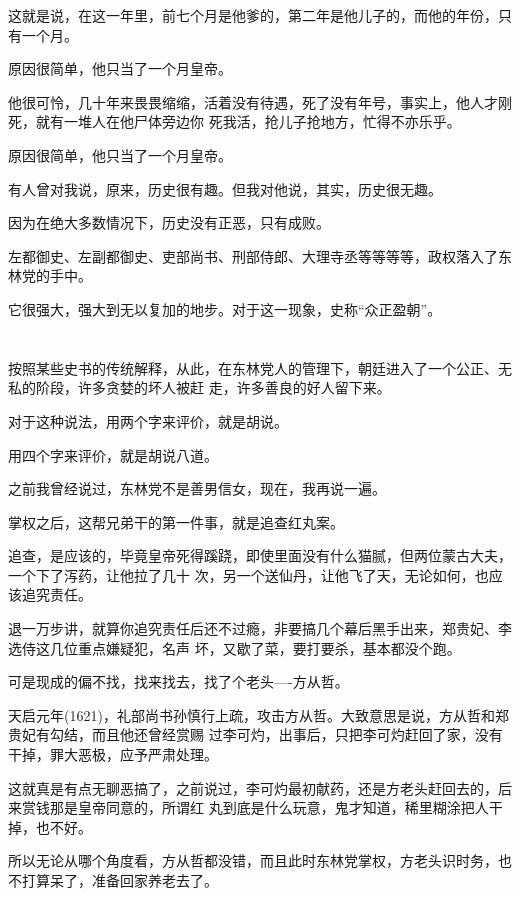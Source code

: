 \documentclass[11pt,a4paper,onecolumn]{article}
\begin{document}
这就是说，在这一年里，前七个月是他爹的，第二年是他儿子的，而他的年份，只有一个月。

原因很简单，他只当了一个月皇帝。

他很可怜，几十年来畏畏缩缩，活着没有待遇，死了没有年号，事实上，他人才刚死，就有一堆人在他尸体旁边你
死我活，抢儿子抢地方，忙得不亦乐乎。

原因很简单，他只当了一个月皇帝。

有人曾对我说，原来，历史很有趣。但我对他说，其实，历史很无趣。

因为在绝大多数情况下，历史没有正恶，只有成败。

左都御史、左副都御史、吏部尚书、刑部侍郎、大理寺丞等等等等，政权落入了东林党的手中。

它很强大，强大到无以复加的地步。对于这一现象，史称``众正盈朝''。

\section[\thesection]{}

按照某些史书的传统解释，从此，在东林党人的管理下，朝廷进入了一个公正、无私的阶段，许多贪婪的坏人被赶
走，许多善良的好人留下来。

对于这种说法，用两个字来评价，就是胡说。

用四个字来评价，就是胡说八道。

之前我曾经说过，东林党不是善男信女，现在，我再说一遍。

掌权之后，这帮兄弟干的第一件事，就是追查红丸案。

追查，是应该的，毕竟皇帝死得蹊跷，即使里面没有什么猫腻，但两位蒙古大夫，一个下了泻药，让他拉了几十
次，另一个送仙丹，让他飞了天，无论如何，也应该追究责任。

退一万步讲，就算你追究责任后还不过瘾，非要搞几个幕后黑手出来，郑贵妃、李选侍这几位重点嫌疑犯，名声
坏，又歇了菜，要打要杀，基本都没个跑。

可是现成的偏不找，找来找去，找了个老头----方从哲。

天启元年(1621)，礼部尚书孙慎行上疏，攻击方从哲。大致意思是说，方从哲和郑贵妃有勾结，而且他还曾经赏赐
过李可灼，出事后，只把李可灼赶回了家，没有干掉，罪大恶极，应予严肃处理。

这就真是有点无聊恶搞了，之前说过，李可灼最初献药，还是方老头赶回去的，后来赏钱那是皇帝同意的，所谓红
丸到底是什么玩意，鬼才知道，稀里糊涂把人干掉，也不好。

所以无论从哪个角度看，方从哲都没错，而且此时东林党掌权，方老头识时务，也不打算呆了，准备回家养老去了。
\end{document}
